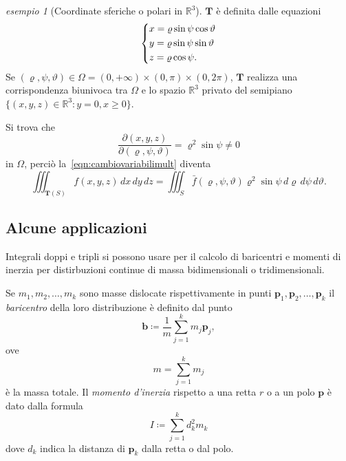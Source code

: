 \documentclass[a4paper]{book}
\numberwithin{equation}{section}
\renewcommand{\theta}{\vartheta}
\renewcommand{\rho}{\varrho}
\theoremstyle{plain}
\theoremstyle{definition}
\theoremstyle{remark}
\renewcommand{\vec}{\boldsymbol}
\theoremstyle{example}
\newtheorem{exmp}{esempio}[section]
\begin{document}
\begin{exmp}[Coordinate sferiche o polari in $\mathbb{R}^3$] $\vec{T}$ è definita dalle equazioni
	\begin{equation}
		\begin{dcases}
			x = \rho\sin\psi\cos\theta \\
			y = \rho\sin\psi\sin\theta \\
			z = \rho\cos\psi.
		\end{dcases}
	\end{equation}
	Se $(\rho, \psi, \theta) \in \Omega = (0, +\infty) \times (0, \pi) \times (0, 2\pi)$, $\vec{T}$ realizza una corrispondenza biunivoca tra $\Omega$ e lo spazio $\mathbb{R}^3$ privato del semipiano $\{(x, y, z) \in \mathbb{R}^3 \colon y = 0, x \ge 0\}$.

	Si trova che
	\begin{equation*}
		\frac{\partial (x, y, z)}{\partial (\rho, \psi, \theta)} = \rho^2\sin\psi \ne 0
	\end{equation*}
	in $\Omega$, perciò la~\eqref{eqn:cambiovariabilimult} diventa
	\begin{equation*}
		\iiint_{\vec{T}(S)}f(x, y, z)\,dx\,dy\,dz = \iiint_S \bar{f}(\rho, \psi, \theta)\rho^2\sin\psi\,d\rho\,d\psi\,d\theta.
	\end{equation*}

\end{exmp}

\subsection{Alcune applicazioni}
Integrali doppi e tripli si possono usare per il calcolo di baricentri e momenti di inerzia per distirbuzioni continue di massa bidimensionali o tridimensionali.

Se $m_1, m_2, \dots, m_k$ sono masse dislocate rispettivamente in punti $\vec{p}_1, \vec{p}_2, \dots, \vec{p}_k$ il \emph{baricentro} della loro distribuzione è definito dal punto
\begin{equation*}
	\vec{b} \coloneqq \frac{1}{m}\sum_{j = 1}^k m_j\vec{p}_j,
\end{equation*}
ove
\begin{equation*}
	m = \sum_{j=1}^km_j
\end{equation*}
è la massa totale. Il \emph{momento d'inerzia} rispetto a una retta $r$ o a un polo $\vec{p}$ è dato dalla formula
\begin{equation*}
	I \coloneqq \sum_{j=1}^k d_k^2m_k
\end{equation*}
dove $d_k$ indica la distanza di $\vec{p}_k$ dalla retta o dal polo.
\end{document}
